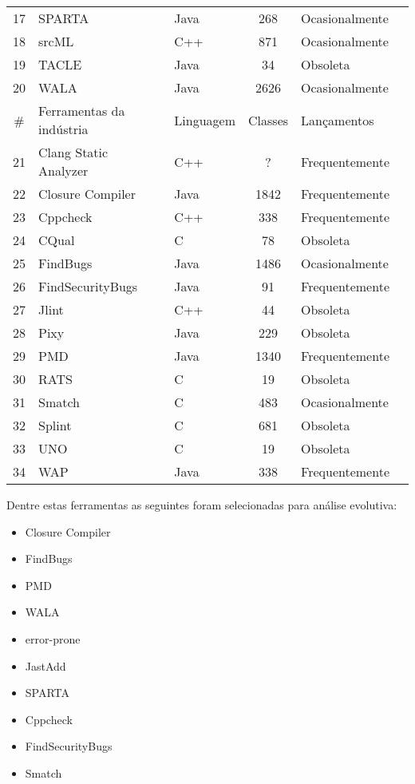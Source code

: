 \begin{table}[H]
\begin{tabular}{| c | l | l | c | l | l |}
    17 & SPARTA                  & Java   & 268   & Ocasionalmente \\
    18 & srcML                   & C++    & 871   & Ocasionalmente \\
    19 & TACLE                   & Java   & 34    & Obsoleta       \\
    20 & WALA                    & Java   & 2626  & Ocasionalmente \\
    \hline
    \# & Ferramentas da indústria & Linguagem & Classes & Lançamentos \\
    \hline
    21 & Clang Static Analyzer    & C++   & ?     & Frequentemente \\
    22 & Closure Compiler         & Java  & 1842  & Frequentemente \\
    23 & Cppcheck                 & C++   & 338   & Frequentemente \\
    24 & CQual                    & C     & 78    & Obsoleta       \\
    25 & FindBugs                 & Java  & 1486  & Ocasionalmente \\
    26 & FindSecurityBugs         & Java  & 91    & Frequentemente \\
    27 & Jlint                    & C++   & 44    & Obsoleta       \\
    28 & Pixy                     & Java  & 229   & Obsoleta       \\
    29 & PMD                      & Java  & 1340  & Frequentemente \\
    30 & RATS                     & C     & 19    & Obsoleta       \\
    31 & Smatch                   & C     & 483   & Ocasionalmente \\
    32 & Splint                   & C     & 681   & Obsoleta       \\
    33 & UNO                      & C     & 19    & Obsoleta       \\
    34 & WAP                      & Java  & 338   & Frequentemente \\
    \hline
  \end{tabular}
  \label{total-de-ferramentas}
\end{table}

Dentre estas ferramentas as seguintes foram selecionadas para análise evolutiva:

\begin{itemize}
  \item Closure Compiler         
  \item FindBugs                 
  \item PMD                      
  \item WALA                    
  \item error-prone
  \item JastAdd
  \item SPARTA
  \item Cppcheck
  \item FindSecurityBugs
  \item Smatch
\end{itemize}


